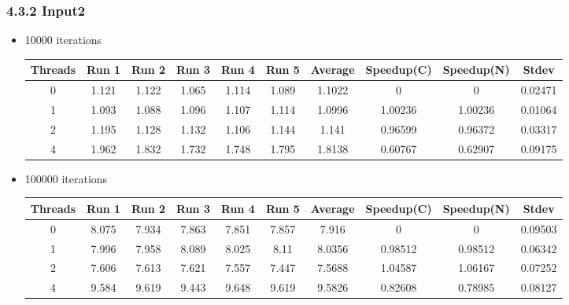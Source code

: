 \documentclass{article}
\begin{document}
\subsubsection*{4.3.2 Input2} 
 \begin{itemize}
\item 10000 iterations
\begin{center}
 \begin{adjustbox}{width=\columnwidth, center} 
 \begin{tabular}{ | |c | c c c c c | c | c c | c | |} \hline 
 Threads & Run 1 & Run 2 & Run 3 & Run 4 & Run 5 & Average & Speedup(C) & Speedup(N) & Stdev \\ [0.5ex] 
 \hline 
 \hline 
0& 1.121 & 1.122 & 1.065 & 1.114 & 1.089 & 1.1022 & 0 & 0 & 0.02471\\ 
 \hline
1& 1.093 & 1.088 & 1.096 & 1.107 & 1.114 & 1.0996 & 1.00236 & 1.00236 & 0.01064\\ 
 \hline
2& 1.195 & 1.128 & 1.132 & 1.106 & 1.144 & 1.141 & 0.96599 & 0.96372 & 0.03317\\ 
 \hline
4& 1.962 & 1.832 & 1.732 & 1.748 & 1.795 & 1.8138 & 0.60767 & 0.62907 & 0.09175\\ 
 \hline
\end{tabular} 
 \end{adjustbox} 
 \end{center} 
\item 100000 iterations
\begin{center}
 \begin{adjustbox}{width=\columnwidth, center} 
 \begin{tabular}{ | |c | c c c c c | c | c c | c | |} \hline 
 Threads & Run 1 & Run 2 & Run 3 & Run 4 & Run 5 & Average & Speedup(C) & Speedup(N) & Stdev \\ [0.5ex] 
 \hline 
 \hline 
0& 8.075 & 7.934 & 7.863 & 7.851 & 7.857 & 7.916 & 0 & 0 & 0.09503\\ 
 \hline
1& 7.996 & 7.958 & 8.089 & 8.025 & 8.11 & 8.0356 & 0.98512 & 0.98512 & 0.06342\\ 
 \hline
2& 7.606 & 7.613 & 7.621 & 7.557 & 7.447 & 7.5688 & 1.04587 & 1.06167 & 0.07252\\ 
 \hline
4& 9.584 & 9.619 & 9.443 & 9.648 & 9.619 & 9.5826 & 0.82608 & 0.78985 & 0.08127\\ 
 \hline
\end{tabular} 
 \end{adjustbox} 
 \end{center} 
\end{itemize}
\end{document}
